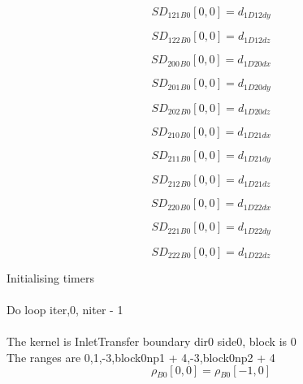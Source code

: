\documentclass{article}
\begin{document}
\begin{dmath}{SD_{121}{_{B0}}}[{0,0}] = d_{1 D12 dy}\end{dmath}

\begin{dmath}{SD_{122}{_{B0}}}[{0,0}] = d_{1 D12 dz}\end{dmath}

\begin{dmath}{SD_{200}{_{B0}}}[{0,0}] = d_{1 D20 dx}\end{dmath}

\begin{dmath}{SD_{201}{_{B0}}}[{0,0}] = d_{1 D20 dy}\end{dmath}

\begin{dmath}{SD_{202}{_{B0}}}[{0,0}] = d_{1 D20 dz}\end{dmath}

\begin{dmath}{SD_{210}{_{B0}}}[{0,0}] = d_{1 D21 dx}\end{dmath}

\begin{dmath}{SD_{211}{_{B0}}}[{0,0}] = d_{1 D21 dy}\end{dmath}

\begin{dmath}{SD_{212}{_{B0}}}[{0,0}] = d_{1 D21 dz}\end{dmath}

\begin{dmath}{SD_{220}{_{B0}}}[{0,0}] = d_{1 D22 dx}\end{dmath}

\begin{dmath}{SD_{221}{_{B0}}}[{0,0}] = d_{1 D22 dy}\end{dmath}

\begin{dmath}{SD_{222}{_{B0}}}[{0,0}] = d_{1 D22 dz}\end{dmath}

\noindent Initialising timers\\
\\\noindent Do loop iter,0, niter - 1\\
\\\noindent The kernel is InletTransfer boundary dir0 side0, block is 0\\\noindent The ranges are 0,1,-3,block0np1 + 4,-3,block0np2 + 4\\\begin{dmath}{\rho{_{B0}}}[{0,0}] = {\rho{_{B0}}}[{-1,0}]\end{dmath}
\end{document}

